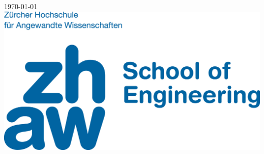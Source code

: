 \begin{titlepage}
	
	
	{\large \today}\\[2cm] %
	
	
	\includegraphics{img/logo_zhaw}\\[1cm] %
	
	
	\vfill %
	
\end{titlepage}